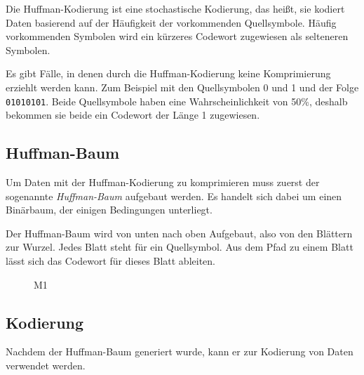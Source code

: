 \documentclass[twoside,11pt,a4paper]{article}
\theoremstyle{break}
\begin{document}
Die Huffman-Kodierung ist eine stochastische Kodierung, das heißt, sie kodiert
Daten basierend auf der Häufigkeit der vorkommenden Quellsymbole. Häufig
vorkommenden Symbolen wird ein kürzeres Codewort zugewiesen als selteneren
Symbolen.

Es gibt Fälle, in denen durch die Huffman-Kodierung keine Komprimierung erziehlt
werden kann. Zum Beispiel mit den Quellsymbolen 0 und 1 und der Folge
{\tt01010101}. Beide Quellsymbole haben eine Wahrscheinlichkeit von 50\%,
deshalb bekommen sie beide ein Codewort der Länge 1 zugewiesen.

\subsection{Huffman-Baum}

Um Daten mit der Huffman-Kodierung zu komprimieren muss zuerst der sogenannte
\emph{Huffman-Baum} aufgebaut werden. Es handelt sich dabei um einen Binärbaum,
der einigen Bedingungen unterliegt.

Der Huffman-Baum wird von unten nach oben Aufgebaut, also von den Blättern zur
Wurzel. Jedes Blatt steht für ein Quellsymbol. Aus dem Pfad zu einem Blatt lässt
sich das Codewort für dieses Blatt ableiten.



\begin{figure}
\centering
{}
\caption{M1} \label{fig:M1}
\end{figure}

\subsection{Kodierung}
Nachdem der Huffman-Baum generiert wurde, kann er zur Kodierung von Daten
verwendet werden.
\end{document}
